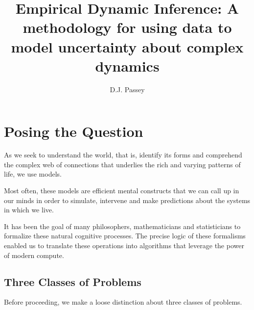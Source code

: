 \documentclass{article}
\title{Empirical Dynamic Inference: A  methodology for using data to model uncertainty about complex dynamics}
\author{D.J. Passey}
\begin{document}
\maketitle

\section*{Posing the Question}
As we seek to understand the world, that is, identify its forms and comprehend the complex web of connections
that underlies the rich and varying patterns of life, we use models.

Most often, these models are efficient mental constructs that we can call up in our minds in order to simulate,
intervene and make predictions about the systems in which we live.

It has been the goal of many philosophers, mathematicians and statisticians to formalize these natural
cognitive processes. The precise logic of these formalisms enabled us to translate these operations into
algorithms that leverage the power of modern compute.

\subsection*{Three Classes of Problems}

Before proceeding, we make a loose distinction about three classes of problems.
\end{document}
